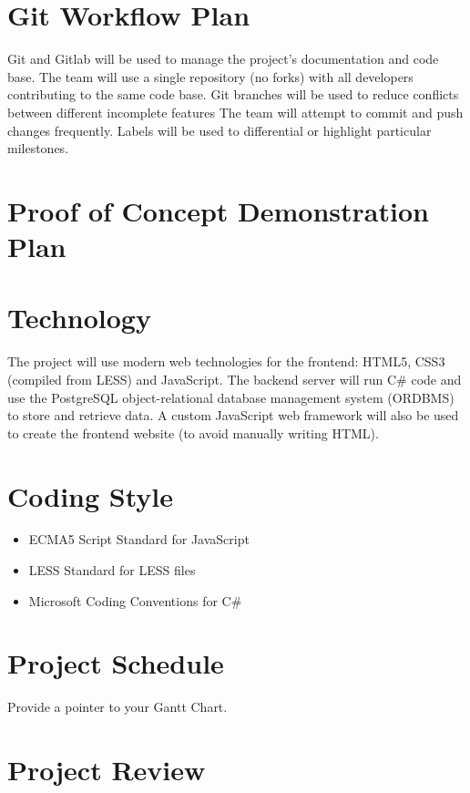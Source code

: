 \documentclass{article}
\begin{document}
\section{Git Workflow Plan}
Git and Gitlab will be used to manage the project's documentation and code
base. The team will use a single repository (no forks) with all developers
contributing to the same code base. Git branches will be used to reduce
conflicts between different incomplete features The team will attempt to commit
and push changes frequently. Labels will be used to differential or highlight
particular milestones.

\section{Proof of Concept Demonstration Plan}

\section{Technology}
The project will use modern web technologies for the frontend: HTML5, CSS3
(compiled from LESS) and JavaScript. The backend server will run C\# code and
use the PostgreSQL object-relational database management system (ORDBMS) to
store and retrieve data. A custom JavaScript web framework will also be used to
create the frontend website (to avoid manually writing HTML).

\section{Coding Style}
\begin{itemize}
  \item ECMA5 Script Standard for JavaScript
  \item LESS Standard for LESS files
  \item Microsoft Coding Conventions for C\#
\end{itemize}

\section{Project Schedule}

Provide a pointer to your Gantt Chart.

\section{Project Review}
\end{document}
